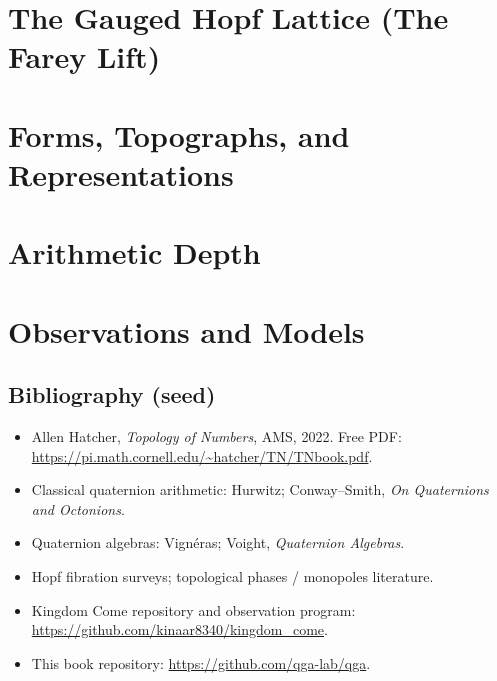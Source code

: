 \documentclass[11pt,oneside,openany]{book}
\begin{document}
\part{The Gauged Hopf Lattice (The Farey Lift)}



\part{Forms, Topographs, and Representations}




\part{Arithmetic Depth}



\part{Observations and Models}


\appendix







\backmatter
\chapter*{Bibliography (seed)}
\begin{itemize}[leftmargin=*]
  \item Allen Hatcher, \emph{Topology of Numbers}, AMS, 2022.
        Free PDF: \url{https://pi.math.cornell.edu/~hatcher/TN/TNbook.pdf}.
  \item Classical quaternion arithmetic: Hurwitz; Conway--Smith, \emph{On Quaternions and Octonions}.
  \item Quaternion algebras: Vignéras; Voight, \emph{Quaternion Algebras}.
  \item Hopf fibration surveys; topological phases / monopoles literature.
  \item Kingdom Come repository and observation program:
        \url{https://github.com/kinaar8340/kingdom_come}.
  \item This book repository: \url{https://github.com/qga-lab/qga}.
\end{itemize}
\end{document}
